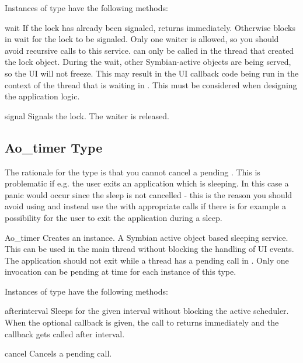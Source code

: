 Instances of  type have the following methods:

\begin{methoddesc}[Ao_lock]{wait}{}
If the lock has already been signaled, returns immediately. Otherwise blocks 
in wait for the lock to be signaled. Only one waiter is allowed, so you 
should avoid recursive calls to this service.  can only be 
called in the thread that created the lock object. During the wait, other 
Symbian-active objects are being served, so the UI will not freeze. This may 
result in the UI callback code being run in the context of the thread that 
is waiting in . This must be considered when designing 
the application logic.
\end{methoddesc}

\begin{methoddesc}[Ao_lock]{signal}{}
Signals the lock. The waiter is released.
\end{methoddesc}

\subsection{Ao_timer Type}
\label{subsec:Aotimer}

The rationale for the  type is that you cannot cancel a 
pending . This is problematic if e.g. the user exits 
an application which is sleeping. In this case a panic would occur since the 
sleep is not cancelled - this is the reason you should avoid using 
 and instead use the  with 
appropriate  calls if there is for example a possibility for 
the user to exit the application during a sleep.

\begin{classdesc}{Ao_timer}{}
Creates an  instance. A Symbian active object based 
sleeping service. This can be used in the main thread without blocking the 
handling of UI events. The application should not exit while a thread has a 
pending  call in . Only one  
invocation can be pending at time for each instance of this type.
\end{classdesc}

Instances of  type have the following methods:

\begin{methoddesc}[Ao_timer]{after}{interval }
Sleeps for the given interval without blocking the active scheduler. When 
the optional callback is given, the call to  returns 
immediately and the callback gets called after interval.
\end{methoddesc}

\begin{methoddesc}[Ao_timer]{cancel}{}
Cancels a pending  call.
\end{methoddesc}
